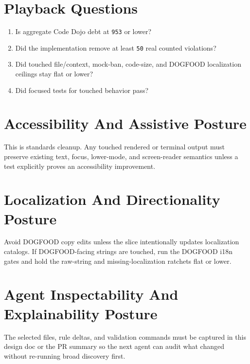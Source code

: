 \section{Playback Questions}\label{record-236-playback-questions}

\begin{enumerate}
\def\labelenumi{\arabic{enumi}.}
\tightlist
\item
  Is aggregate Code Dojo debt at \texttt{9\allowbreak{}5\allowbreak{}3} or lower?
\item
  Did the implementation remove at least \texttt{5\allowbreak{}0} real counted violations?
\item
  Did touched file/context, mock-ban, code-size, and DOGFOOD localization ceilings stay flat or lower?
\item
  Did focused tests for touched behavior pass?
\end{enumerate}

\section{Accessibility And Assistive Posture}\label{record-236-accessibility-and-assistive-posture}

This is standards cleanup. Any touched rendered or terminal output must preserve existing text, focus, lower-mode, and screen-reader semantics unless a test explicitly proves an accessibility improvement.

\section{Localization And Directionality Posture}\label{record-236-localization-and-directionality-posture}

Avoid DOGFOOD copy edits unless the slice intentionally updates localization catalogs. If DOGFOOD-facing strings are touched, run the DOGFOOD i18n gates and hold the raw-string and missing-localization ratchets flat or lower.

\section{Agent Inspectability And Explainability Posture}\label{record-236-agent-inspectability-and-explainability-posture}

The selected files, rule deltas, and validation commands must be captured in this design doc or the PR summary so the next agent can audit what changed without re-running broad discovery first.

